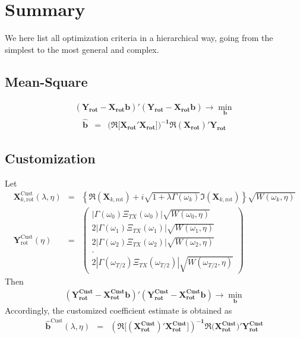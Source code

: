 \documentclass[11pt]{article}
\begin{document}
  

\section{Summary}\label{summarys}

We here list all optimization criteria in a hierarchical way, going from the simplest to the most general and complex.

\subsection{Mean-Square
}
\begin{eqnarray*}
(\mathbf{Y_{\textrm{rot}}-X_{\textrm{rot}}b})'(\mathbf{Y_{\textrm{rot}}-X_{\textrm{rot}}b})\to\min_{\mathbf{b}}
\end{eqnarray*}
\begin{eqnarray*}
\mathbf{\hat{b}}&=&\mathbf{\Bigg(\Re\Big[X_{\textrm{rot}}'X_{\textrm{rot}}\Big]\Bigg)^{-1}\Re(X_{\textrm{rot}})'Y_{\textrm{rot}}}
\end{eqnarray*}


\subsection{Customization}
Let 
\begin{eqnarray*}
\mathbf{X}_{k,\textrm{rot}}^{\textrm{Cust}}(\lambda,\eta)&=&\left\{\Re(\mathbf{X}_{k,\textrm{rot}})+i\sqrt{1+\lambda\Gamma(\omega_k)}\Im(\mathbf{X}_{k,\textrm{rot}})\right\}\sqrt{W(\omega_k,\eta)}\\
\mathbf{Y}_{\textrm{rot}}^{\textrm{Cust}}(\eta)&=& \left(\begin{array}{c}\left|\Gamma(\omega_0)\Xi_{TX}(\omega_0)\right|\sqrt{W(\omega_0,\eta)}\\ 
2|\Gamma(\omega_1)\Xi_{TX}(\omega_1)|\sqrt{W(\omega_1,\eta)}\\
2|\Gamma(\omega_2)\Xi_{TX}(\omega_2)|\sqrt{W(\omega_2,\eta)}\\
.\\
2|\Gamma(\omega_{T/2})\Xi_{TX}(\omega_{T/2})|\sqrt{W(\omega_{T/2},\eta)}
\end{array}\right)
\end{eqnarray*}
Then
\begin{eqnarray*}
(\mathbf{Y_{\textrm{rot}}^{\textrm{Cust}}-X_{\textrm{rot}}^{\textrm{Cust}}b})'(\mathbf{Y_{\textrm{rot}}^{\textrm{Cust}}-X_{\textrm{rot}}^{\textrm{Cust}}b})\to\min_{\mathbf{b}}
\end{eqnarray*}
Accordingly, the customized coefficient estimate is obtained as 
\begin{eqnarray*}
\mathbf{\hat{b}}^{\textrm{Cust}}(\lambda,\eta)&=&\mathbf{\left(\Re\Big[(X_{\textrm{rot}}^{\textrm{Cust} })' X_{\textrm{rot}}^{\textrm{Cust}}\Big]\right)^{-1}\Re(X_{\textrm{rot}}^{\textrm{Cust}}})'
\mathbf{Y_{\textrm{rot}}^{\textrm{Cust}}}
\end{eqnarray*}
\end{document}
